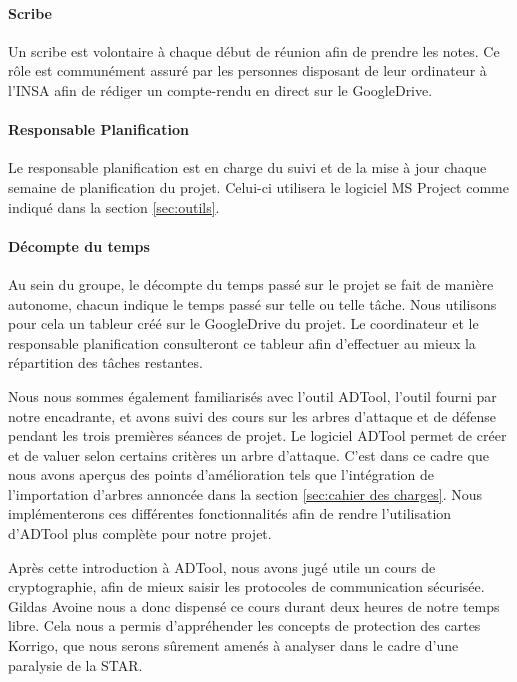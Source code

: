 	    \paragraph{Scribe} Un scribe est volontaire à chaque début de réunion afin de prendre les notes. Ce rôle est communément assuré par les personnes disposant de leur ordinateur à l'INSA afin de rédiger un compte-rendu en direct sur le GoogleDrive.
	    \paragraph{Responsable Planification} Le responsable planification est en charge du suivi et de la mise à jour chaque semaine de planification du projet. Celui-ci utilisera le logiciel MS Project comme indiqué dans la section \ref{sec:outils}.
	    \paragraph{Décompte du temps} Au sein du groupe, le décompte du temps passé sur le projet se fait de manière autonome, chacun indique le temps passé sur telle ou telle tâche. Nous utilisons pour cela un tableur créé sur le GoogleDrive du projet. Le coordinateur et le responsable planification consulteront ce tableur afin d'effectuer au mieux la répartition des tâches restantes.

	    Nous nous sommes également familiarisés avec l'outil ADTool, l'outil fourni par notre encadrante, et avons suivi des cours sur les arbres d'attaque et de défense pendant les trois premières séances de projet. Le logiciel ADTool permet de créer et de valuer selon certains critères un arbre d'attaque. C'est dans ce cadre que nous avons aperçus des points d'amélioration tels que l'intégration de l'importation d'arbres annoncée dans la section \ref{sec:cahier des charges}. Nous implémenterons ces différentes fonctionnalités afin de rendre l'utilisation d'ADTool plus complète pour notre projet.
	    
	    Après cette introduction à ADTool, nous avons jugé utile un cours de cryptographie, afin de mieux saisir les protocoles de communication sécurisée. Gildas Avoine nous a donc dispensé ce cours durant deux heures de notre temps libre. Cela nous a permis d'appréhender les concepts de protection des cartes Korrigo, que nous serons sûrement amenés à analyser dans le cadre d'une paralysie de la STAR.


